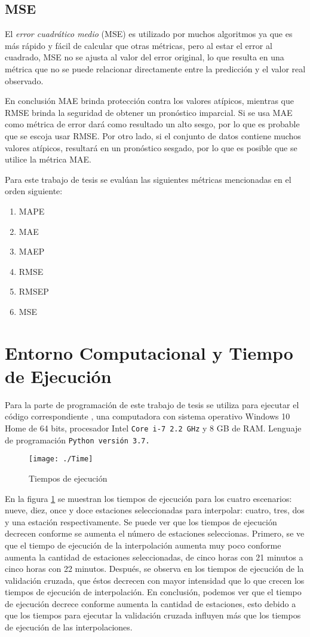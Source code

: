 \subsection{MSE}
El {\em error cuadrático medio} (MSE) es utilizado por muchos algoritmos ya que es más rápido y fácil de calcular que otras métricas, pero al estar el error al cuadrado, MSE no se ajusta al valor del error original, lo que resulta en una métrica que no se puede relacionar directamente entre la predicción y el valor real observado.

En conclusión MAE brinda protección contra los valores atípicos, mientras que RMSE brinda la seguridad de obtener un pronóstico imparcial. Si se usa MAE como métrica de error dará como resultado un alto sesgo, por lo que es probable que se escoja usar RMSE. Por otro lado, si el conjunto de datos contiene muchos valores atípicos, resultará en un pronóstico sesgado, por lo que es posible que se utilice la métrica MAE.

Para este trabajo de tesis se evalúan las siguientes métricas mencionadas en el orden siguiente:
\begin{enumerate}
\item MAPE
\item MAE
\item MAEP
\item RMSE
\item RMSEP
\item MSE
\end{enumerate}



\section{Entorno Computacional y Tiempo de Ejecución}
Para la parte de programación de este trabajo de tesis se utiliza para ejecutar el código correspondiente \citep{sernagit}, una  computadora con sistema operativo Windows 10 Home de 64 bits, procesador Intel \texttt{Core i-7 2.2 GHz} y 8 GB de RAM. Lenguaje de programación \texttt{Python versión 3.7.}

\begin{figure}[H]
\centering
\texttt{[image: ./Time]}
\caption{Tiempos de ejecución}
\label{time}
\end{figure}

En la figura \ref{time} se muestran los tiempos de ejecución para los cuatro escenarios: nueve, diez, once y doce estaciones seleccionadas para interpolar: cuatro, tres, dos y una estación respectivamente. Se puede ver que los tiempos de ejecución decrecen conforme se aumenta el número de estaciones seleccionas. Primero, se ve que el tiempo de ejecución de la interpolación aumenta muy poco conforme aumenta la cantidad de estaciones seleccionadas, de cinco horas con 21 minutos a cinco horas con 22 minutos. Después, se observa en los tiempos de ejecución de la validación cruzada, que éstos decrecen con mayor intensidad que lo que crecen los tiempos de ejecución de interpolación. En conclusión, podemos ver que el tiempo de ejecución decrece conforme aumenta la cantidad de estaciones, esto debido a que los tiempos para ejecutar la validación cruzada influyen más que los tiempos de ejecución de las interpolaciones.


